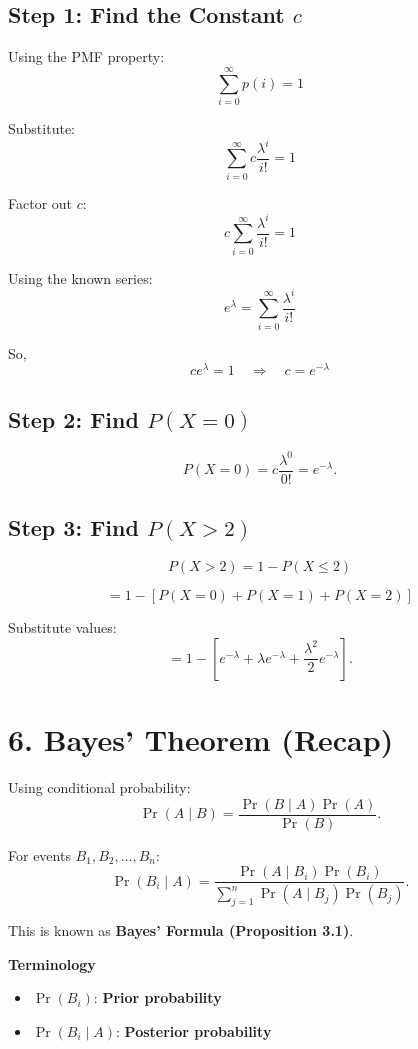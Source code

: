 \documentclass[12pt]{article}
\begin{document}
\subsection*{Step 1: Find the Constant $c$}

Using the PMF property:
\[
\sum_{i=0}^{\infty} p(i) = 1
\]

Substitute:
\[
\sum_{i=0}^{\infty} c \frac{\lambda^i}{i!} = 1
\]

Factor out $c$:
\[
c \sum_{i=0}^{\infty} \frac{\lambda^i}{i!} = 1
\]

Using the known series:
\[
e^{\lambda} = \sum_{i=0}^{\infty} \frac{\lambda^i}{i!}
\]

So,
\[
c e^{\lambda} = 1
\quad \Rightarrow \quad
c = e^{-\lambda}
\]

\subsection*{Step 2: Find $P(X=0)$}

\[
P(X=0) = c \frac{\lambda^0}{0!}
= e^{-\lambda}.
\]

\subsection*{Step 3: Find $P(X>2)$}

\[
P(X>2) = 1 - P(X \le 2)
\]

\[
= 1 - [P(X=0) + P(X=1) + P(X=2)]
\]

Substitute values:
\[
= 1 - \left[
e^{-\lambda}
+ \lambda e^{-\lambda}
+ \frac{\lambda^2}{2} e^{-\lambda}
\right].
\]

\section*{6. Bayes’ Theorem (Recap)}

Using conditional probability:
\[
\Pr(A \mid B) = \frac{\Pr(B \mid A)\Pr(A)}{\Pr(B)}.
\]

For events $B_1, B_2, \dots, B_n$:
\[
\Pr(B_i \mid A) =
\frac{\Pr(A \mid B_i)\Pr(B_i)}
{\sum_{j=1}^{n} \Pr(A \mid B_j)\Pr(B_j)}.
\]

This is known as \textbf{Bayes’ Formula (Proposition 3.1)}.

\textbf{Terminology}
\begin{itemize}
\item $\Pr(B_i)$: \textbf{Prior probability}
\item $\Pr(B_i \mid A)$: \textbf{Posterior probability}
\end{itemize}
\end{document}
